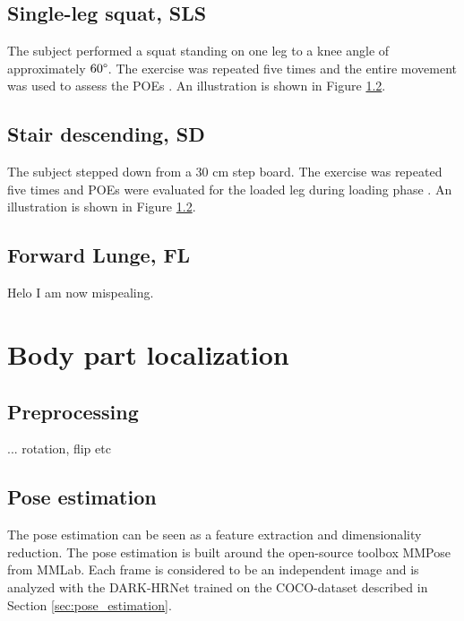 \subsection{Single-leg squat, SLS} \label{sec:met-SLS}
The subject performed a squat standing on one leg to a knee angle of approximately $60\degree$. The exercise was repeated five times and the entire movement was used to assess the POEs \cite{Nae2020}. An illustration is shown in Figure \ref{}.

\subsection{Stair descending, SD}
The subject stepped down from a 30 cm step board. The exercise was repeated five times and POEs were evaluated for the loaded leg during loading phase \cite{Nae2020}. An illustration is shown in Figure \ref{}.

\subsection{Forward Lunge, FL}

Helo I am now mispealing.





\section{Body part localization} \label{sec:met-loc}
\subsection{Preprocessing}
...
rotation, flip etc

\subsection{Pose estimation}
The pose estimation can be seen as a feature extraction and dimensionality reduction.
The pose estimation is built around the open-source toolbox MMPose \cite{mmpose} from MMLab. Each frame is considered to be an independent image and is analyzed with the DARK-HRNet \cite{Zhang2020, Sun2019} trained on the COCO-dataset \cite{Lin2014} described in Section \ref{sec:pose_estimation}.


